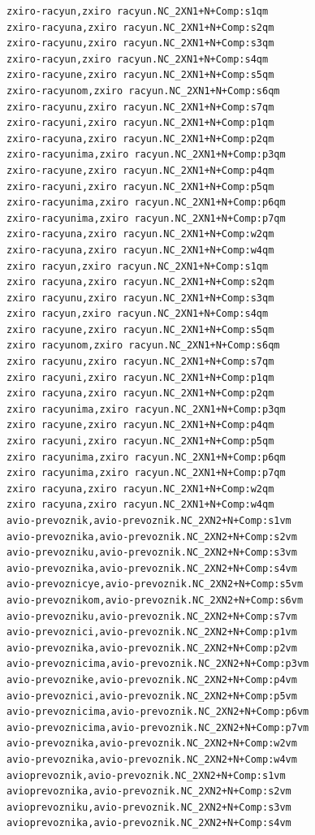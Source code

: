 \footnotesize
\begin{verbatim}
zxiro-racyun,zxiro racyun.NC_2XN1+N+Comp:s1qm
zxiro-racyuna,zxiro racyun.NC_2XN1+N+Comp:s2qm
zxiro-racyunu,zxiro racyun.NC_2XN1+N+Comp:s3qm
zxiro-racyun,zxiro racyun.NC_2XN1+N+Comp:s4qm
zxiro-racyune,zxiro racyun.NC_2XN1+N+Comp:s5qm
zxiro-racyunom,zxiro racyun.NC_2XN1+N+Comp:s6qm
zxiro-racyunu,zxiro racyun.NC_2XN1+N+Comp:s7qm
zxiro-racyuni,zxiro racyun.NC_2XN1+N+Comp:p1qm
zxiro-racyuna,zxiro racyun.NC_2XN1+N+Comp:p2qm
zxiro-racyunima,zxiro racyun.NC_2XN1+N+Comp:p3qm
zxiro-racyune,zxiro racyun.NC_2XN1+N+Comp:p4qm
zxiro-racyuni,zxiro racyun.NC_2XN1+N+Comp:p5qm
zxiro-racyunima,zxiro racyun.NC_2XN1+N+Comp:p6qm
zxiro-racyunima,zxiro racyun.NC_2XN1+N+Comp:p7qm
zxiro-racyuna,zxiro racyun.NC_2XN1+N+Comp:w2qm
zxiro-racyuna,zxiro racyun.NC_2XN1+N+Comp:w4qm
zxiro racyun,zxiro racyun.NC_2XN1+N+Comp:s1qm
zxiro racyuna,zxiro racyun.NC_2XN1+N+Comp:s2qm
zxiro racyunu,zxiro racyun.NC_2XN1+N+Comp:s3qm
zxiro racyun,zxiro racyun.NC_2XN1+N+Comp:s4qm
zxiro racyune,zxiro racyun.NC_2XN1+N+Comp:s5qm
zxiro racyunom,zxiro racyun.NC_2XN1+N+Comp:s6qm
zxiro racyunu,zxiro racyun.NC_2XN1+N+Comp:s7qm
zxiro racyuni,zxiro racyun.NC_2XN1+N+Comp:p1qm
zxiro racyuna,zxiro racyun.NC_2XN1+N+Comp:p2qm
zxiro racyunima,zxiro racyun.NC_2XN1+N+Comp:p3qm
zxiro racyune,zxiro racyun.NC_2XN1+N+Comp:p4qm
zxiro racyuni,zxiro racyun.NC_2XN1+N+Comp:p5qm
zxiro racyunima,zxiro racyun.NC_2XN1+N+Comp:p6qm
zxiro racyunima,zxiro racyun.NC_2XN1+N+Comp:p7qm
zxiro racyuna,zxiro racyun.NC_2XN1+N+Comp:w2qm
zxiro racyuna,zxiro racyun.NC_2XN1+N+Comp:w4qm
avio-prevoznik,avio-prevoznik.NC_2XN2+N+Comp:s1vm
avio-prevoznika,avio-prevoznik.NC_2XN2+N+Comp:s2vm
avio-prevozniku,avio-prevoznik.NC_2XN2+N+Comp:s3vm
avio-prevoznika,avio-prevoznik.NC_2XN2+N+Comp:s4vm
avio-prevoznicye,avio-prevoznik.NC_2XN2+N+Comp:s5vm
avio-prevoznikom,avio-prevoznik.NC_2XN2+N+Comp:s6vm
avio-prevozniku,avio-prevoznik.NC_2XN2+N+Comp:s7vm
avio-prevoznici,avio-prevoznik.NC_2XN2+N+Comp:p1vm
avio-prevoznika,avio-prevoznik.NC_2XN2+N+Comp:p2vm
avio-prevoznicima,avio-prevoznik.NC_2XN2+N+Comp:p3vm
avio-prevoznike,avio-prevoznik.NC_2XN2+N+Comp:p4vm
avio-prevoznici,avio-prevoznik.NC_2XN2+N+Comp:p5vm
avio-prevoznicima,avio-prevoznik.NC_2XN2+N+Comp:p6vm
avio-prevoznicima,avio-prevoznik.NC_2XN2+N+Comp:p7vm
avio-prevoznika,avio-prevoznik.NC_2XN2+N+Comp:w2vm
avio-prevoznika,avio-prevoznik.NC_2XN2+N+Comp:w4vm
avioprevoznik,avio-prevoznik.NC_2XN2+N+Comp:s1vm
avioprevoznika,avio-prevoznik.NC_2XN2+N+Comp:s2vm
avioprevozniku,avio-prevoznik.NC_2XN2+N+Comp:s3vm
avioprevoznika,avio-prevoznik.NC_2XN2+N+Comp:s4vm

\end{verbatim}
